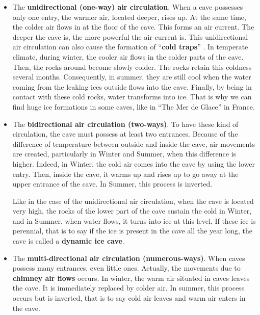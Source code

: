 \documentclass{article}
\begin{document}
\begin{itemize}[label=$\square$]

  \item The \textbf{unidirectional (one-way) air circulation}. When a cave possesses only one entry, the warmer air, located deeper, rises up.  At the same time, the colder air flows in at the floor of the cave. This forms an air current. The deeper the cave is, the more powerful the air current is. This unidirectional air circulation can also cause the formation of “\textbf{cold traps}” . In temperate climate, during winter, the cooler air flows in the colder parts of the cave. Then, the rocks around become slowly colder. The rocks retain this coldness several 	months. Consequently, in summer, they are still cool when the water coming from the leaking ices outside flows into the cave. Finally, by being in contact with these cold rocks, water transforms into ice. That is why we can find huge ice formations in some caves, like in “The Mer de Glace” in France.

  \item The \textbf{bidirectional air circulation (two-ways)}. To have these kind of circulation, the cave must possess at least two entrances. Because of the difference of temperature between outside and inside the cave, air movements are created, particularly in Winter and Summer, when this difference is higher. Indeed, in Winter, the cold air comes into the cave by using the lower entry. Then, inside the cave, it warms up and rises up to go away at the upper entrance of the cave. In Summer, this process is inverted. \par
  Like in the case of the unidirectional air circulation, when the cave is located very high, the rocks of the lower part of the cave sustain the cold in Winter, and in Summer, when water flows, it turns into ice at this level. If these ice is perennial, that is to say if the ice is present in the cave all the year long, the cave is called a \textbf{dynamic ice cave}.

  \item The \textbf{multi-directional air circulation (numerous-ways)}. When caves possess many entrances, even little ones. Actually, the movements due to \textbf{chimney air flows} occurs. In winter, the warm air situated in caves leaves the cave. It is immediately replaced by colder air. In summer, this process occurs but is inverted, that is to say cold air leaves and warm air enters in the cave.

\end{itemize}
\end{document}
